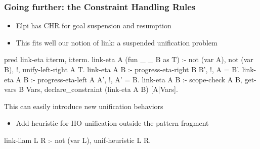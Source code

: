 \documentclass{pres}
\begin{document}
\begin{frame}[fragile]
  \frametitle{Going further: the Constraint Handling Rules}

  \begin{itemize}
    \item Elpi has CHR for goal suspension and resumption
    \item This fits well our notion of link: a suspended unification problem
  \end{itemize}

  \begin{elpicode}
    pred link-eta i:term, i:term.
    link-eta A (fun _ _ B as T) :- not (var A), not (var B), !, 
      unify-left-right A T. 
    link-eta A B :- progress-eta-right B B', !, A = B'. 
    link-eta A B :- progress-eta-left  A A', !, A' = B.
    link-eta A B :- scope-check A B, get-vars B Vars, 
      declare_constraint (link-eta A B) [A|Vars].
  \end{elpicode}
  \mysep

  This can easily introduce new unification behaviors
  \begin{itemize}
    \item Add heuristic for HO unification outside the pattern fragment
  \end{itemize}


  \begin{elpicode}
    link-llam L R :- not (var L), unif-heuristic L R.
  \end{elpicode}



\end{frame}
\end{document}
